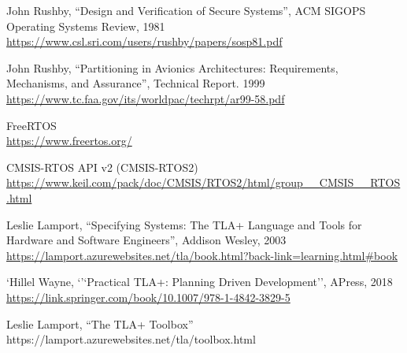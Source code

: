 \documentclass[11pt,letterpaper,twoside,openany]{book}
\begin{document}
\begin{thebibliography}{9}
John Rushby, ``Design and Verification of Secure Systems'', ACM SIGOPS Operating Systems Review, 1981 \\
\url{https://www.csl.sri.com/users/rushby/papers/sosp81.pdf}

John Rushby, ``Partitioning in Avionics Architectures: Requirements, Mechanisms, and Assurance'', Technical Report. 1999 \\
\url{https://www.tc.faa.gov/its/worldpac/techrpt/ar99-58.pdf}

FreeRTOS \\
\url{https://www.freertos.org/}

CMSIS-RTOS API v2 (CMSIS-RTOS2) \\
\url{https://www.keil.com/pack/doc/CMSIS/RTOS2/html/group__CMSIS__RTOS.html}

Leslie Lamport, ``Specifying Systems: The TLA+ Language and Tools for Hardware and Software Engineers'', Addison Wesley, 2003
\url{https://lamport.azurewebsites.net/tla/book.html?back-link=learning.html#book}

`Hillel Wayne, `'`Practical TLA+: Planning Driven Development'', APress, 2018
\url{https://link.springer.com/book/10.1007/978-1-4842-3829-5}

Leslie Lamport, ``The TLA+ Toolbox''
https://lamport.azurewebsites.net/tla/toolbox.html

\end{thebibliography}
\end{document}
